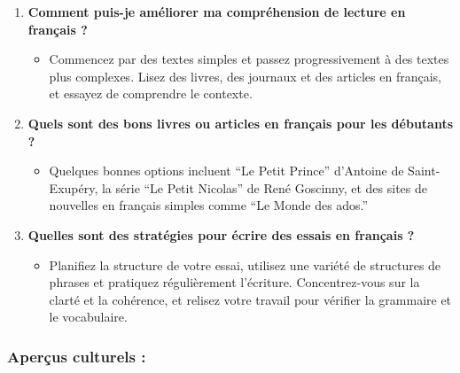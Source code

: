 \documentclass[
  16pt,
  letterpaper,
  DIV=11,
  numbers=noendperiod]{scrartcl}
\providecommand{\tightlist}{%
  \setlength{\itemsep}{0pt}\setlength{\parskip}{0pt}}\usepackage{longtable,booktabs,array}
\begin{document}
\begin{enumerate}
\def\labelenumi{\arabic{enumi}.}
\setcounter{enumi}{8}
\tightlist
\item
  \textbf{Comment puis-je améliorer ma compréhension de lecture en
  français ?}

  \begin{itemize}
  \tightlist
  \item
    Commencez par des textes simples et passez progressivement à des
    textes plus complexes. Lisez des livres, des journaux et des
    articles en français, et essayez de comprendre le contexte.
  \end{itemize}
\item
  \textbf{Quels sont des bons livres ou articles en français pour les
  débutants ?}

  \begin{itemize}
  \tightlist
  \item
    Quelques bonnes options incluent ``Le Petit Prince'' d'Antoine de
    Saint-Exupéry, la série ``Le Petit Nicolas'' de René Goscinny, et
    des sites de nouvelles en français simples comme ``Le Monde des
    ados.''
  \end{itemize}
\item
  \textbf{Quelles sont des stratégies pour écrire des essais en français
  ?}

  \begin{itemize}
  \tightlist
  \item
    Planifiez la structure de votre essai, utilisez une variété de
    structures de phrases et pratiquez régulièrement l'écriture.
    Concentrez-vous sur la clarté et la cohérence, et relisez votre
    travail pour vérifier la grammaire et le vocabulaire.
  \end{itemize}
\end{enumerate}

\subsubsection{Aperçus culturels :}\label{aperuxe7us-culturels}
\end{document}
